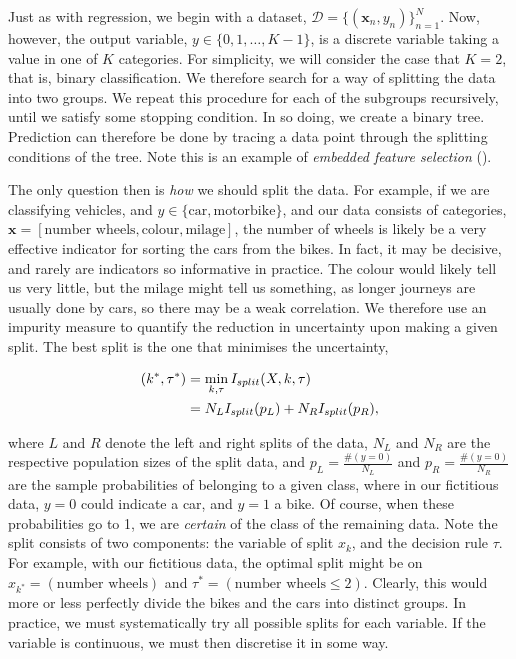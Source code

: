 \documentclass[11pt]{amsart}
\begin{document}
Just as with regression, we begin with a dataset, $\mathcal{D} = \{(\mathbf{x}_n, y_n)\}_{n=1}^{N}$. Now, however, the output variable, $y \in \{0, 1, \dots, K-1\}$, is a discrete variable taking a value in one of $K$ categories. For simplicity, we will consider the case that $K = 2$, that is, binary classification. We therefore search for a way of splitting the data into two groups. We repeat this procedure for each of the subgroups recursively, until we satisfy some stopping condition. In so doing, we create a binary tree. Prediction can therefore be done by tracing a data point through the splitting conditions of the tree. Note this is an example of \emph{embedded feature selection} (\cite{featureselectionsurvey}).

The only question then is \emph{how} we should split the data. For example, if we are classifying vehicles, and $y \in \{\text{car}, \text{motorbike}\}$, and our data consists of categories, $\mathbf{x} = [\text{number wheels}, \text{colour}, \text{milage}]$, the number of wheels is likely be a very effective indicator for sorting the cars from the bikes. In fact, it may be decisive, and rarely are indicators so informative in practice. The colour would likely tell us very little, but the milage might tell us something, as longer journeys are usually done by cars, so there may be a weak correlation. We therefore use an impurity measure to quantify the reduction in uncertainty upon making a given split. The best split is the one that minimises the uncertainty,

\begin{align}
( k^*, \tau^*) &= \min_{k, \tau} I_{split}(X, k, \tau) \notag \\
&= N_LI_{split}(p_L) + N_RI_{split}(p_R), \notag
\end{align}

where $L$ and $R$ denote the left and right splits of the data, $N_L$ and $N_R$ are the respective population sizes of the split data, and $p_L = \frac{\#(y = 0)}{N_L}$ and $p_R = \frac{\#(y = 0)}{N_R}$ are the sample probabilities of belonging to a given class, where in our fictitious data, $y=0$ could indicate a car, and $y=1$ a bike. Of course, when these probabilities go to 1, we are \emph{certain} of the class of the remaining data. Note the split consists of two components: the variable of split $x_k$, and the decision rule $\tau$. For example, with our fictitious data, the optimal split might be on $x_{k^*} = (\text{number wheels})$ and $\tau^* = (\text{number wheels} \leq 2)$. Clearly, this would more or less perfectly divide the bikes and the cars into distinct groups. In practice, we must systematically try all possible splits for each variable. If the variable is continuous, we must then discretise it in some way.
\end{document}
